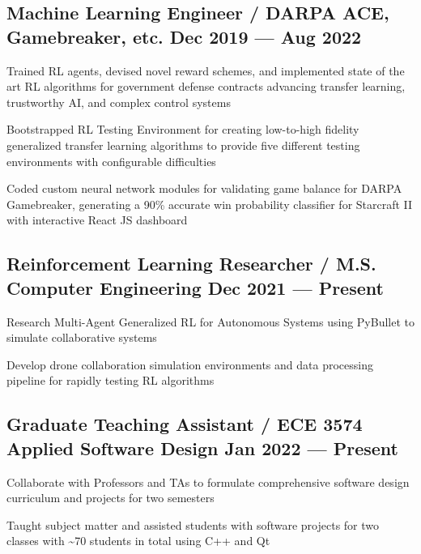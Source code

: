 \subsection{{Machine Learning Engineer / DARPA ACE, Gamebreaker, etc. \hfill Dec 2019 --- Aug 2022}}
\begin{zitemize}
	\item Trained RL agents, devised novel reward schemes, and implemented state of the art RL algorithms for government defense contracts advancing transfer learning, trustworthy AI, and complex
	control systems
	\item Bootstrapped RL Testing Environment for creating low-to-high fidelity generalized transfer learning algorithms
	to provide five different testing environments with configurable difficulties
	\item Coded custom neural network modules for validating game balance for DARPA Gamebreaker, generating a 90\%
	accurate win probability classifier for Starcraft II with interactive React JS dashboard
\end{zitemize}

\subsection{{Reinforcement Learning Researcher / M.S. Computer Engineering  \hfill Dec 2021 --- Present}}
\begin{zitemize}
	\item Research Multi-Agent Generalized RL for Autonomous Systems using PyBullet to simulate
	collaborative systems
	\item Develop drone collaboration simulation environments and data processing pipeline for rapidly testing RL algorithms
\end{zitemize}

\subsection{{Graduate Teaching Assistant / ECE 3574 Applied Software Design  \hfill Jan 2022 --- Present}}
\begin{zitemize}
	\item Collaborate with Professors and TAs to formulate comprehensive software design curriculum and projects for two
	semesters
	\item Taught subject matter and assisted students with software projects for two classes with \textasciitilde 70 students in
	total using C++ and Qt
\end{zitemize}

